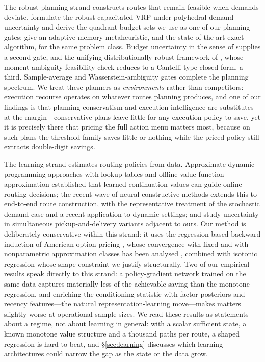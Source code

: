 \documentclass[preprint,authoryear,12pt]{elsarticle}
\theoremstyle{definition}
\theoremstyle{remark}
\begin{document}
The robust-planning strand constructs routes that remain feasible when
demands deviate. \citet{gounaris2013robust} formulate the robust
capacitated VRP under polyhedral demand uncertainty and derive the
quadrant-budget sets we use as one of our planning gates;
\citet{gounaris2016adaptive} give an adaptive memory metaheuristic, and
\citet{pessoa2021branch} the state-of-the-art exact algorithm, for the
same problem class. Budget uncertainty in the sense of
\citet{bertsimas2004price} supplies a second gate, and the unifying
distributionally robust framework of \citet{ghosal2024unifying}, whose
moment-ambiguity feasibility check reduces to a Cantelli-type closed
form, a third. Sample-average and Wasserstein-ambiguity gates
\citep{esfahani2018data} complete the planning spectrum. We treat these
planners as \emph{environments} rather than competitors: execution
recourse operates on whatever routes planning produces, and one of our
findings is that planning conservatism and execution intelligence are
substitutes at the margin---conservative plans leave little for any
execution policy to save, yet it is precisely there that pricing the
full action menu matters most, because on such plans the threshold
family saves little or nothing while the priced policy still extracts double-digit
savings.

The learning strand estimates routing policies from data.
Approximate-dynamic-programming approaches with lookup tables
\citep{novoa2009approximate} and offline value-function approximation
\citep{ulmer2019offline} established that learned continuation values
can guide online routing decisions; the recent wave of neural
constructive methods extends this to end-to-end route construction, with
\citet{iklassov2024rl} the representative treatment of the stochastic
demand case and \citet{kadyrov2025deep} a recent application to dynamic
settings; \citet{hu2025vehicle} and \citet{wang2026drone} study
uncertainty in simultaneous pickup-and-delivery variants adjacent to
ours. Our method is deliberately conservative within this strand: it
uses the regression-based backward induction of American-option pricing
\citep{longstaff2001valuing,tsitsiklis2001regression}, whose convergence
with fixed and with nonparametric approximation classes has been analysed
\citep{clement2002analysis,egloff2005monte,zanger2013quantitative},
combined with isotonic
regression \citep{barlow1972statistical,robbins1955empirical} whose
shape constraint we justify structurally. Two of our empirical results
speak directly to this strand: a policy-gradient network trained on the
same data captures materially less of the achievable saving than the
monotone regression, and enriching the conditioning statistic with
factor posteriors and recency features---the natural
representation-learning move---makes matters slightly worse at
operational sample sizes. We read these results as statements about a
regime, not about learning in general: with a scalar sufficient state,
a known monotone value structure and a thousand paths per route, a
shaped regression is hard to beat, and \S\ref{sec:learning} discusses
which learning architectures could narrow the gap as the state or the
data grow.
\end{document}

